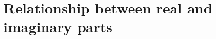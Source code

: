 \documentclass[12pt,twoside,book]{article}
\begin{document}
\section{Relationship between real and imaginary parts}
\label{sec:reim}

\vskip 0.1in
\end{document}
